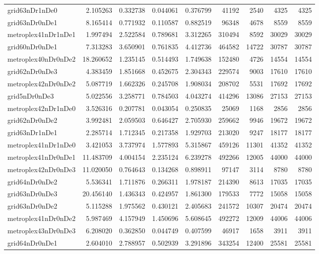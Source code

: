 \begin{longtable}{|l|r|r|r|r|r|r|r|r|}
grid63nDr1nDe0 & 2.105263 & 0.332738 & 0.044061 & 0.376799 & 41192 & 2540 & 4325 & 4325 \\
grid63nDr0nDe1 & 8.165414 & 0.771932 & 0.110587 & 0.882519 & 96348 & 4678 & 8559 & 8559 \\
metroplex41nDr1nDe1 & 1.997494 & 2.522584 & 0.789681 & 3.312265 & 310494 & 8592 & 30029 & 30029 \\
grid60nDr0nDe1 & 7.313283 & 3.650901 & 0.761835 & 4.412736 & 464582 & 14722 & 30787 & 30787 \\
metroplex40nDr0nDe2 & 18.260652 & 1.235145 & 0.514493 & 1.749638 & 152480 & 4726 & 14554 & 14554 \\
grid62nDr0nDe3 & 4.383459 & 1.851668 & 0.452675 & 2.304343 & 229574 & 9003 & 17610 & 17610 \\
metroplex42nDr0nDe2 & 5.087719 & 1.662326 & 0.245708 & 1.908034 & 208702 & 5531 & 17692 & 17692 \\
grid5nDr0nDe3 & 5.022556 & 3.258771 & 0.784503 & 4.043274 & 414296 & 13086 & 27153 & 27153 \\
metroplex42nDr1nDe0 & 3.526316 & 0.207781 & 0.043054 & 0.250835 & 25069 & 1168 & 2856 & 2856 \\
grid62nDr0nDe2 & 3.992481 & 2.059503 & 0.646427 & 2.705930 & 259662 & 9946 & 19672 & 19672 \\
grid63nDr1nDe1 & 2.285714 & 1.712345 & 0.217358 & 1.929703 & 213020 & 9247 & 18177 & 18177 \\
metroplex41nDr1nDe0 & 3.421053 & 3.737974 & 1.577893 & 5.315867 & 459126 & 11301 & 41352 & 41352 \\
metroplex41nDr0nDe1 & 11.483709 & 4.004154 & 2.235124 & 6.239278 & 492266 & 12005 & 44000 & 44000 \\
metroplex42nDr0nDe3 & 11.020050 & 0.764643 & 0.134268 & 0.898911 & 97147 & 3114 & 8780 & 8780 \\
grid64nDr0nDe2 & 5.536341 & 1.711876 & 0.266311 & 1.978187 & 214390 & 8613 & 17035 & 17035 \\
grid63nDr0nDe3 & 20.456140 & 1.436343 & 0.424957 & 1.861300 & 179533 & 7772 & 15058 & 15058 \\
grid63nDr0nDe2 & 5.115288 & 1.975562 & 0.430121 & 2.405683 & 241572 & 10307 & 20474 & 20474 \\
metroplex41nDr0nDe2 & 5.987469 & 4.157949 & 1.450696 & 5.608645 & 492272 & 12009 & 44006 & 44006 \\
metroplex43nDr0nDe3 & 6.208020 & 0.362850 & 0.044749 & 0.407599 & 46917 & 1658 & 3911 & 3911 \\
grid64nDr0nDe1 & 2.604010 & 2.788957 & 0.502939 & 3.291896 & 343254 & 12400 & 25581 & 25581 \\

\end{longtable}

